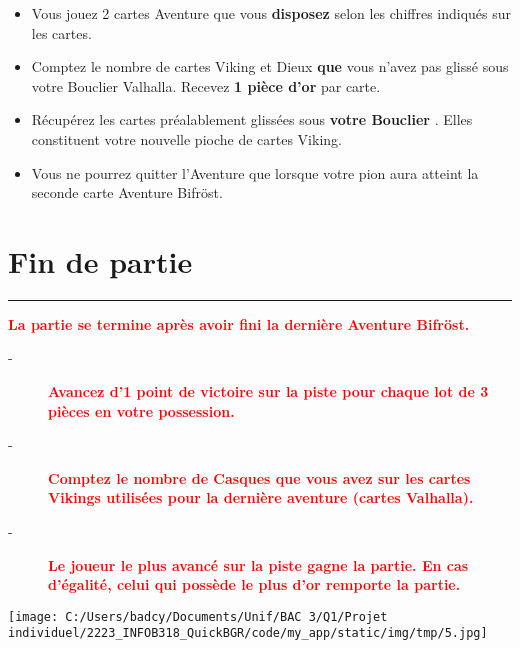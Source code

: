 \documentclass{scrartcl}%
\begin{document}
\begin{itemize}%
\item%
%
 Vous jouez 2 cartes Aventure que vous %
\textcolor{mygreen}{%
\textbf{disposez}%
}%
\textit{ }%
 selon les chiffres indiqués sur les cartes.
%
\item%
%
 Comptez le nombre de cartes Viking et Dieux %
\textcolor{mygreen}{%
\textbf{que}%
}%
\textit{ }%
 vous n'avez pas glissé sous votre Bouclier Valhalla. Recevez %
\textcolor{mygreen}{%
\textbf{1 pièce d'or}%
}%
\textit{ }%
 par carte.
%
\item%
%
 Récupérez les cartes préalablement glissées sous %
\textcolor{mygreen}{%
\textbf{votre Bouclier}%
}%
. Elles constituent votre nouvelle pioche de cartes Viking.
%
\item%
%
 Vous ne pourrez quitter l'Aventure que lorsque votre pion aura atteint la seconde carte Aventure Bifröst.
%
\end{itemize}

%
\sectionfont{\color{red}}%
\subsectionfont{\color{red}}%
\subsubsectionfont{\color{red}}%
\section{ Fin de partie
}%
\label{sec:Findepartie}%
\textcolor{red}{\rule{18cm}{0.07cm}}\break%
\textcolor{red}{%
\textbf{La partie se termine après avoir fini la dernière Aventure Bifröst.}%
}%

%
\begin{description}%
\item[{-} ]%
%
\textcolor{red}{%
\textbf{Avancez d'1 point de victoire sur la piste pour chaque lot de 3 pièces en votre possession.}%
}%

%
\item[{-} ]%
%
\textcolor{red}{%
\textbf{Comptez le nombre de Casques que vous avez sur les cartes Vikings utilisées pour la dernière aventure (cartes Valhalla).}%
}%

%
\item[{-} ]%
%
\textcolor{red}{%
\textbf{Le joueur le plus avancé sur la piste gagne la partie. En cas d'égalité, celui qui possède le plus d'or remporte la partie.}%
}%

%
\end{description}%
%
\begin{center}\texttt{[image: C:/Users/badcy/Documents/Unif/BAC 3/Q1/Projet individuel/2223\_INFOB318\_QuickBGR/code/my\_app/static/img/tmp/5.jpg]}\end{center}%

%
\end{document}
